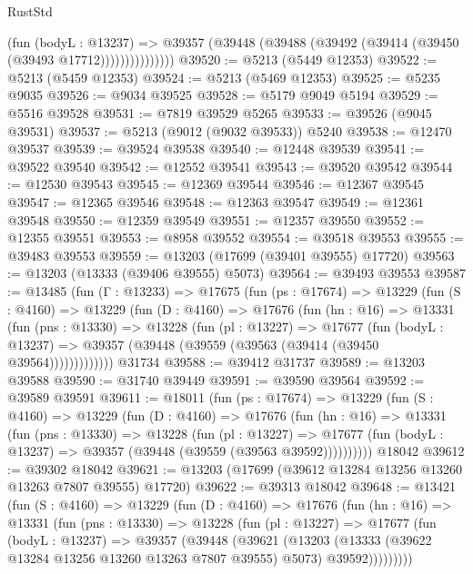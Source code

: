 \begin{lexlean}{RustStd}
\begin{coremodule}
                    (fun (bodyL : @13237) =>
                    @39357 (@39448 (@39488 (@39492 (@39414 (@39450 (@39493 @17712)))))))))))))))
@39520 := @5213 (@5449 @12353)
@39522 := @5213 (@5459 @12353)
@39524 := @5213 (@5469 @12353)
@39525 := @5235 @9035
@39526 := @9034 @39525
@39528 := @5179 @9049 @5194
@39529 := @5516 @39528
@39531 := @7819 @39529 @5265
@39533 := @39526 (@9045 @39531)
@39537 := @5213 (@9012 (@9032 @39533)) @5240
@39538 := @12470 @39537
@39539 := @39524 @39538
@39540 := @12448 @39539
@39541 := @39522 @39540
@39542 := @12552 @39541
@39543 := @39520 @39542
@39544 := @12530 @39543
@39545 := @12369 @39544
@39546 := @12367 @39545
@39547 := @12365 @39546
@39548 := @12363 @39547
@39549 := @12361 @39548
@39550 := @12359 @39549
@39551 := @12357 @39550
@39552 := @12355 @39551
@39553 := @8958 @39552
@39554 := @39518 @39553
@39555 := @39483 @39553
@39559 := @13203 (@17699 (@39401 @39555) @17720)
@39563 := @13203 (@13333 (@39406 @39555) @5073)
@39564 := @39493 @39553
@39587 := @13485
    (fun (Γ : @13233) =>
    @17675
      (fun (ps : @17674) =>
      @13229
        (fun (S : @4160) =>
        @13229
          (fun (D : @4160) =>
          @17676
            (fun (hn : @16) =>
            @13331
              (fun (pns : @13330) =>
              @13228
                (fun (pl : @13227) =>
                @17677
                  (fun (bodyL : @13237) =>
                  @39357 (@39448 (@39559 (@39563 (@39414 (@39450 @39564)))))))))))))
    @31734
@39588 := @39412 @31737
@39589 := @13203 @39588
@39590 := @31740 @39449
@39591 := @39590 @39564
@39592 := @39589 @39591
@39611 := @18011
    (fun (ps : @17674) =>
    @13229
      (fun (S : @4160) =>
      @13229
        (fun (D : @4160) =>
        @17676
          (fun (hn : @16) =>
          @13331
            (fun (pns : @13330) =>
            @13228
              (fun (pl : @13227) =>
              @17677 (fun (bodyL : @13237) => @39357 (@39448 (@39559 (@39563 @39592))))))))))
    @18042
@39612 := @39302 @18042
@39621 := @13203 (@17699 (@39612 @13284 @13256 @13260 @13263 @7807 @39555) @17720)
@39622 := @39313 @18042
@39648 := @13421
    (fun (S : @4160) =>
    @13229
      (fun (D : @4160) =>
      @17676
        (fun (hn : @16) =>
        @13331
          (fun (pns : @13330) =>
          @13228
            (fun (pl : @13227) =>
            @17677
              (fun (bodyL : @13237) =>
              @39357
                (@39448
                  (@39621
                    (@13203
                      (@13333 (@39622 @13284 @13256 @13260 @13263 @7807 @39555) @5073)
                      @39592)))))))))

\end{coremodule}
\end{lexlean}
